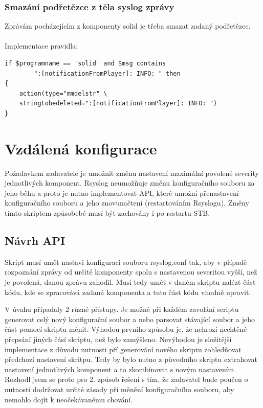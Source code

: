 \documentclass[thesis=B,czech]{FITthesis}[2012/06/26]
\begin{document}
\subsubsection{Smazání podřetězce z těla syslog zprávy}
Zprávám pocházejícím z komponenty solid je třeba smazat zadaný podřetězec.
\\
\\
Implementace pravidla:
\begin{lstlisting}[style=RainerScriptStyle]
if $programname == 'solid' and $msg contains
		":[notificationFromPlayer]: INFO: " then
{
	action(type="mmdelstr" \ 
	stringtobedeleted=":[notificationFromPlayer]: INFO: ")
}
\end{lstlisting}


\section{Vzdálená konfigurace}
Požadavkem zadavatele je umožnit změnu nastavení maximální povolené severity jednotlivých komponent. Rsyslog neumožňuje změnu konfiguračního souboru za jeho běhu a proto je nutno implementovat API, které umožní přenastavení konfiguračního souboru a jeho znovunačtení (restartováním Rsyslogu).
Změny tímto skriptem způsobebé musí být zachovány i po restartu STB.

\subsection{Návrh API}
Skript musí umět nastavi konfiguraci souboru rsyslog.conf tak, aby v případě rozpoznání zprávy od určité komponenty spolu s nastavenou severitou vyšší, než je povolená, danou zprávu zahodil. 
Musí tedy umět v daném skriptu nalézt část kódu, kde se zpracovává zadaná komponenta a tuto část kódu vhodně upravit.

V úvahu připadaly 2 různé přístupy. Je možné při každém zavolání scriptu generovat celý nový konfigurační soubor a nebo parsovat stávající soubor a jeho část pomocí skriptu měnit.
Výhodou prvního způsobu je, že nehrozí nechtěné přepsání jiných čásí skriptu, než bylo zamýšleno. Nevýhodou je složitější implementace z důvodu nutnosti pří generování nového skriptu zohledňovat předchozí nastavení skritpu. Tedy by bylo nutno z původního skriptu extrahovat nastavení jednotlivých komponent a to zkombinovat s novým nastavením.
Rozhodl jsem se proto pro 2. způsob řešení s tím, že zadavatel bude poučen o nutnosti dodržovat určité zásady při měnění konfiguračního souboru, aby nemohlo dojít k neočekávanému chování.
\end{document}
